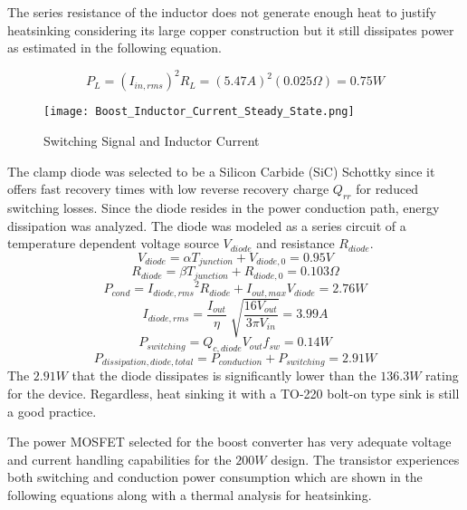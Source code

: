 The series resistance of the inductor does not generate enough heat to justify heatsinking considering its large copper construction but it still dissipates power as estimated in the following equation.

\begin{equation}
P_L = (I_{in,rms})^2R_L = (5.47A)^2(0.025\Omega) = 0.75W 
\end{equation}

\begin{figure}
\centering
\texttt{[image: Boost\_Inductor\_Current\_Steady\_State.png]}
\caption{Switching Signal and Inductor Current}
\label{inductorCurrent}
\end{figure}


The clamp diode was selected to be a Silicon Carbide (SiC) Schottky since it offers fast recovery times with low reverse recovery charge $Q_{rr}$ for reduced switching losses. Since the diode resides in the power conduction path, energy dissipation was analyzed. The diode was modeled as a series circuit of a temperature dependent voltage source $ V_{diode}$ and resistance $R_{diode}$.\cite{CREE}
\begin{equation}
 V_{diode} = \alpha T_{junction}+V_{diode,0} =  0.95V 
\end{equation}
\begin{equation}
 R_{diode} = \beta T_{junction}+R_{diode,0} = 0.103\Omega
\end{equation}
\begin{equation}
 P_{cond} = {I_{diode,rms}}^2R_{diode}+I_{out,max}V_{diode} = 2.76W
\end{equation}
\begin{equation}
 I_{diode,rms} = \frac{I_{out}}{\eta} \sqrt[]{ \frac{16V_{out}}{3 \pi V_{in}}}= 3.99A
\end{equation}
\begin{equation}
P_{switching} = Q_{c,diode}V_{out}f_{sw}=0.14W
\end{equation}
\begin{equation}
 P_{dissipation,diode,total}= P_{conduction}+P_{switching}=2.91W 
\end{equation}
The $2.91W$ that the diode dissipates is significantly lower than the $136.3W$ rating for the device. Regardless, heat sinking it with a TO-220 bolt-on type sink is still a good practice.

The power MOSFET selected for the boost converter has very adequate voltage and current handling capabilities for the $200W$ design. The transistor experiences both switching and conduction power consumption which are shown in the following equations along with a thermal analysis for heatsinking.

